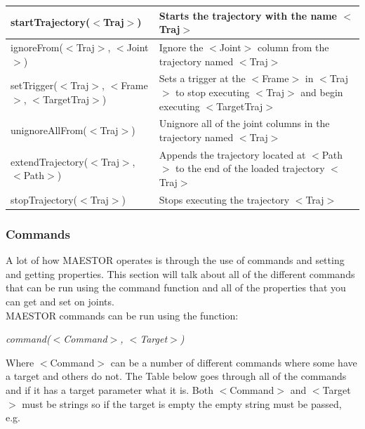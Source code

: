 \documentclass[12pt]{article}
\begin{document}
\begin{center}
\begin{tabular}{| l | p{8cm}|}
		startTrajectory($<$Traj$>$) 
		& Starts the trajectory with the name $<$Traj$>$  \\ \hline
		
		ignoreFrom($<$Traj$>$, $<$Joint$>$) 
		& Ignore the $<$Joint$>$ column from the trajectory named $<$Traj$>$  \\ \hline
		
		setTrigger($<$Traj$>$, $<$Frame$>$, $<$TargetTraj$>$)
		& Sets a trigger at the $<$Frame$>$ in $<$Traj$>$ to stop executing $<$Traj$>$ and begin executing $<$TargetTraj$>$  \\ \hline
		
		unignoreAllFrom($<$Traj$>$)
		& Unignore all of the joint columns in the trajectory named $<$Traj$>$   \\ \hline
		
		extendTrajectory($<$Traj$>$, $<$Path$>$)
		& Appends the trajectory located at $<$Path$>$ to the end of the loaded trajectory $<$Traj$>$  \\ \hline
		
		stopTrajectory($<$Traj$>$)
		& Stops executing the trajectory $<$Traj$>$  \\ \hline
	
	\end{tabular}
\end{center}

\pagebreak 

\subsubsection{Commands}

A lot of how MAESTOR operates is through the use of commands and setting and getting properties. This section will talk about all of the different commands that can be run using the command function and all of the properties that you can get and set on joints.\\

MAESTOR commands can be run using the function: 

\begin{center}
	\textit{command($<$Command$>$, $<$Target$>$)}
\end{center}

Where $<$Command$>$ can be a number of different commands where some have a target and others do not. The Table below goes through all of the commands and if it has a target parameter what it is. Both $<$Command$>$ and $<$Target$>$ must be strings so if the target is empty the empty string must be passed, e.g.
\end{document}
